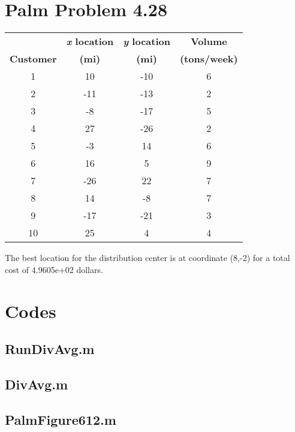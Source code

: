 \documentclass{article}
\begin{document}
\section{Palm Problem 4.28}
\begin{center}
\begin{tabular}{c c c c}
 & \textbf{\textit{x} location} & \textbf{\textit{y} location} & \textbf{Volume}\\
\textbf{Customer} & \textbf{(mi)} & \textbf{(mi)} & \textbf{(tons/week)}\\ \hline
1 & 10 & -10 & 6\\
2 & -11 & -13 & 2\\
3 & -8 & -17 & 5\\
4 & 27 & -26 & 2\\
5 & -3 & 14 & 6\\
6 & 16 & 5 & 9\\
7 & -26 & 22 & 7\\
8 & 14 & -8 & 7\\
9 & -17 & -21 & 3\\
10 & 25 & 4 & 4\\ \hline
\end{tabular}
\end{center}
The best location for the distribution center is at coordinate (8,-2) for a total cost of 4.9605e+02 dollars.

\pagebreak
\appendix
\section{Codes}

\subsection{RunDivAvg.m}
\clearpage

\subsection{DivAvg.m}
\clearpage

\subsection{PalmFigure612.m}
\clearpage
\end{document}

